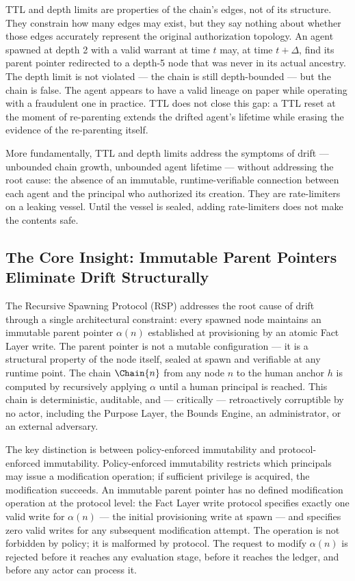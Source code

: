 TTL and depth limits are properties of the chain's edges, not of its structure. They constrain how many edges may exist, but they say nothing about whether those edges accurately represent the original authorization topology. An agent spawned at depth 2 with a valid warrant at time $t$ may, at time $t+\Delta$, find its parent pointer redirected to a depth-5 node that was never in its actual ancestry. The depth limit is not violated — the chain is still depth-bounded — but the chain is false. The agent appears to have a valid lineage on paper while operating with a fraudulent one in practice. TTL does not close this gap: a TTL reset at the moment of re-parenting extends the drifted agent's lifetime while erasing the evidence of the re-parenting itself.

More fundamentally, TTL and depth limits address the symptoms of drift — unbounded chain growth, unbounded agent lifetime — without addressing the root cause: the absence of an immutable, runtime-verifiable connection between each agent and the principal who authorized its creation. They are rate-limiters on a leaking vessel. Until the vessel is sealed, adding rate-limiters does not make the contents safe.

\subsection{The Core Insight: Immutable Parent Pointers Eliminate Drift Structurally}
\label{sec:core-insight}

The Recursive Spawning Protocol (RSP) addresses the root cause of drift through a single architectural constraint: every spawned node maintains an immutable parent pointer $\alpha(n)$ established at provisioning by an atomic Fact Layer write. The parent pointer is not a mutable configuration — it is a structural property of the node itself, sealed at spawn and verifiable at any runtime point. The chain $\Chain{n}$ from any node $n$ to the human anchor $h$ is computed by recursively applying $\alpha$ until a human principal is reached. This chain is deterministic, auditable, and — critically — retroactively corruptible by no actor, including the Purpose Layer, the Bounds Engine, an administrator, or an external adversary.

The key distinction is between policy-enforced immutability and protocol-enforced immutability. Policy-enforced immutability restricts which principals may issue a modification operation; if sufficient privilege is acquired, the modification succeeds. An immutable parent pointer has no defined modification operation at the protocol level: the Fact Layer write protocol specifies exactly one valid write for $\alpha(n)$ — the initial provisioning write at spawn — and specifies zero valid writes for any subsequent modification attempt. The operation is not forbidden by policy; it is malformed by protocol. The request to modify $\alpha(n)$ is rejected before it reaches any evaluation stage, before it reaches the ledger, and before any actor can process it.

